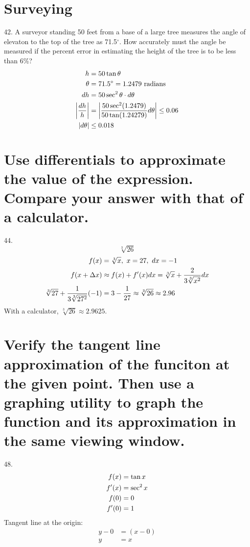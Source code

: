 \documentclass[11pt]{article}
\newcommand*{\set}{\setcounter{equation}{0}}
\begin{document}
\section{Surveying}
42. A surveyor standing 50 feet from a base of a large tree measures the angle of elevaton to the top of the tree as 71.5$^{\circ}$. How accurately must the angle be measured if the percent error in estimating the height of the tree is to be less than 6\%?
\begin{align}
    \set
    h&=50\tan\theta\\
    \theta&=71.5^{\circ}=1.2479\,\,\text{radians}\\
    dh&=50\sec^2\theta\cdot d\theta\\
    \left|\frac{dh}{h}\right|&=\left|\frac{50\sec^2(1.2479)}{50\tan(1.24279)}d\theta\right|\leq 0.06\\
    |d\theta|&\leq 0.018
\end{align}

\section{Use differentials to approximate the value of the expression. Compare your answer with that of a calculator.}
44.\[\sqrt[3]{26}\]
\begin{align}
    \set
    f(x)&=\sqrt[3]{x},\,\, x=27,\,\, dx=-1\\
    f(x+\Delta x)&\approx f(x)+f'(x)dx=\sqrt[3]{x}+\frac{2}{3\sqrt[3]{x^2}}dx\\
    \sqrt[3]{27}+\frac{1}{3\sqrt[3]{27^2}}(-1)&=3-\frac{1}{27}\approx \sqrt[3]{26}\approx 2.96
\end{align}
With a calculator, $\sqrt[3]{26}\approx 2.9625$.

\section{Verify the tangent line approximation of the funciton at the given point. Then use a graphing utility to graph the function and its approximation in the same viewing window.}
48.\begin{align}
   \set
   f(x)&=\tan x\\
   f'(x)&=\sec^2x\\
   f(0)&=0\\
   f'(0)&=1 
\end{align}
Tangent line at the origin:
\begin{align}
    y-0&=(x-0)\\
    y&=x
\end{align}
\end{document}

